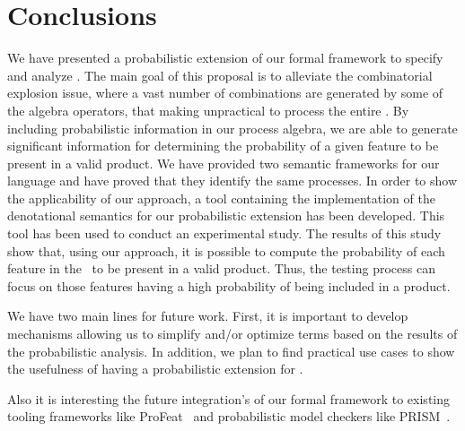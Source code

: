 \section{Conclusions}
\label{section:jstat:concs}

We have presented a probabilistic extension of our
formal framework to specify and analyze \SPLs. The main goal of this
proposal is to alleviate the combinatorial explosion issue, where a vast
number of combinations are generated by some of the algebra operators,
that making unpractical to process the entire \SPL. By including probabilistic information in our process algebra, we are able to generate significant information for determining the probability
of a given feature to be present in a valid product. We have provided two semantic frameworks for our language and have proved that they identify the same processes.
%
In order to show the applicability of our approach, a tool containing the
implementation of the denotational semantics for our probabilistic extension
has been developed. This tool has been used to conduct an experimental study.
%
The results of this study show that, using our approach, it is possible to compute
the probability of each feature in the \SPL\ to be present in a valid product.
Thus, the testing process can focus on those features having a high probability
of being included in a product.



%
%
%
%
We have two main lines for future work. First, it is important to develop
mechanisms allowing us to simplify and/or optimize terms
based on the results of the probabilistic analysis. In addition,
we plan to find practical use cases to show the usefulness of having a probabilistic extension for \SPLs.

Also it is interesting the future integration's of our formal framework to existing tooling frameworks
like ProFeat~\cite{Chrszon2018} and probabilistic model checkers like PRISM~\cite{mgd12}.

